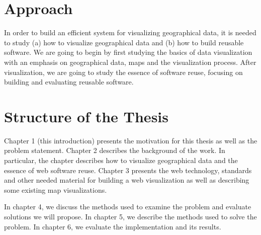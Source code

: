 \section{Approach}

In order to build an efficient system for visualizing geographical data, it is needed to study (a) how to visualize geographical data and (b) how to build reusable software. We are going to begin by first studying the basics of data visualization with an emphasis on geographical data, maps and the visualization process. After visualization, we are going to study the essence of software reuse, focusing on building and evaluating reusable software. 



\section{Structure of the Thesis}
\label{section:structure} 

 Chapter 1 (this introduction) presents the motivation for this thesis as well as the problem statement. Chapter 2 describes the background of the work. In particular, the chapter describes how to visualize geographical data and the essence of web software reuse. Chapter 3 presents the web technology, standards and other needed material for building a web visualization as well as describing some existing map visualizations.

In chapter 4, we discuss the methods used to examine the problem and evaluate solutions we will propose. In chapter 5, we describe the methods used to solve the problem. In chapter 6, we evaluate the implementation and its results. 



